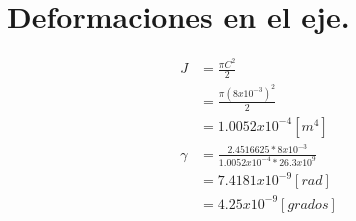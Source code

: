 \section{Deformaciones en el eje.}

\begin{equation} 
\begin{split}
J & = \frac{\pi C^2}{2} \\
  & = \frac{\pi (8x10^{-3})^2}{2} \\
  & = 1.0052x10^{-4} [m^{4}]\\
\gamma & = \frac{2.4516625*8x10^{-3}}{1.0052x10^{-4}*26.3x10^{9}} \\
       & = 7.4181x10^{-9} [rad]\\
       & = 4.25x10^{-9} [grados]
\end{split}
\end{equation}